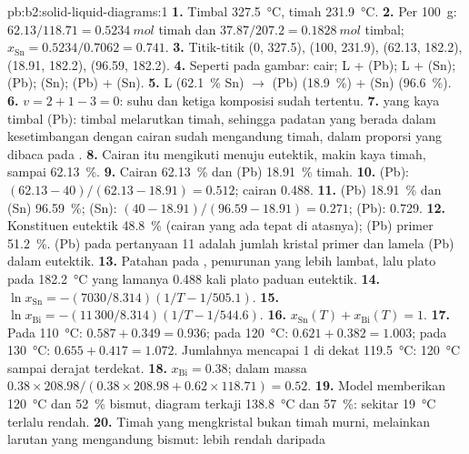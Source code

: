 \begin{solution}{pb:b2:solid-liquid-diagrams:1}
\textbf{1.} Timbal \qty{327.5}{\degreeCelsius}, timah \qty{231.9}{\degreeCelsius}.
\textbf{2.} Per \qty{100}{g}: $62.13/118.71 = \qty{0.5234}{mol}$ timah dan
$37.87/207.2 = \qty{0.1828}{mol}$ timbal; $x_{\mathrm{Sn}} = 0.5234/0.7062 =
0.741$.
\textbf{3.} Titik-titik (0, 327.5), (100, 231.9), (62.13, 182.2),
(18.91, 182.2), (96.59, 182.2).
\textbf{4.} Seperti pada gambar: cair; L + (Pb); L + (Sn); (Pb); (Sn);
(Pb) + (Sn).
\textbf{5.} L (62.1~\% Sn) $\longrightarrow$ (Pb) (18.9~\%) + (Sn) (96.6~\%).
\textbf{6.} $v = 2 + 1 - 3 = 0$: suhu dan ketiga komposisi sudah tertentu.
\textbf{7.}  yang kaya timbal (Pb): timbal melarutkan timah,
sehingga padatan yang berada dalam kesetimbangan dengan cairan sudah
mengandung timah, dalam proporsi yang dibaca pada .
\textbf{8.} Cairan itu mengikuti  menuju eutektik, makin kaya timah,
sampai 62.13~\%.
\textbf{9.} Cairan 62.13~\% dan (Pb) 18.91~\% timah.
\textbf{10.} (Pb): $(62.13 - 40)/(62.13 - 18.91) = 0.512$; cairan 0.488.
\textbf{11.} (Pb) 18.91~\% dan (Sn) 96.59~\%; (Sn): $(40 - 18.91)/(96.59 -
18.91) = 0.271$; (Pb): 0.729.
\textbf{12.} Konstituen eutektik 48.8~\% (cairan yang ada tepat di atasnya);
(Pb) primer 51.2~\%. (Pb) pada pertanyaan 11 adalah jumlah kristal primer
dan lamela (Pb) dalam eutektik.
\textbf{13.} Patahan pada , penurunan yang lebih lambat, lalu plato
pada \qty{182.2}{\degreeCelsius} yang lamanya 0.488 kali plato paduan
eutektik.
\textbf{14.} $\ln x_{\mathrm{Sn}} = -(7030/8.314)(1/T - 1/505.1)$.
\textbf{15.} $\ln x_{\mathrm{Bi}} = -(11\,300/8.314)(1/T - 1/544.6)$.
\textbf{16.} $x_{\mathrm{Sn}}(T) + x_{\mathrm{Bi}}(T) = 1$.
\textbf{17.} Pada \qty{110}{\degreeCelsius}: $0.587 + 0.349 = 0.936$; pada
\qty{120}{\degreeCelsius}: $0.621 + 0.382 = 1.003$; pada
\qty{130}{\degreeCelsius}: $0.655 + 0.417 = 1.072$. Jumlahnya mencapai 1
di dekat \qty{119.5}{\degreeCelsius}: \qty{120}{\degreeCelsius} sampai
derajat terdekat.
\textbf{18.} $x_{\mathrm{Bi}} = 0.38$; dalam massa $0.38 \times 208.98/(0.38 \times
208.98 + 0.62 \times 118.71) = 0.52$.
\textbf{19.} Model memberikan \qty{120}{\degreeCelsius} dan 52~\% bismut,
diagram terkaji \qty{138.8}{\degreeCelsius} dan 57~\%: sekitar
\qty{19}{\degreeCelsius} terlalu rendah.
\textbf{20.} Timah yang mengkristal bukan timah murni, melainkan larutan
yang mengandung bismut:  lebih rendah daripada 
\end{solution}
